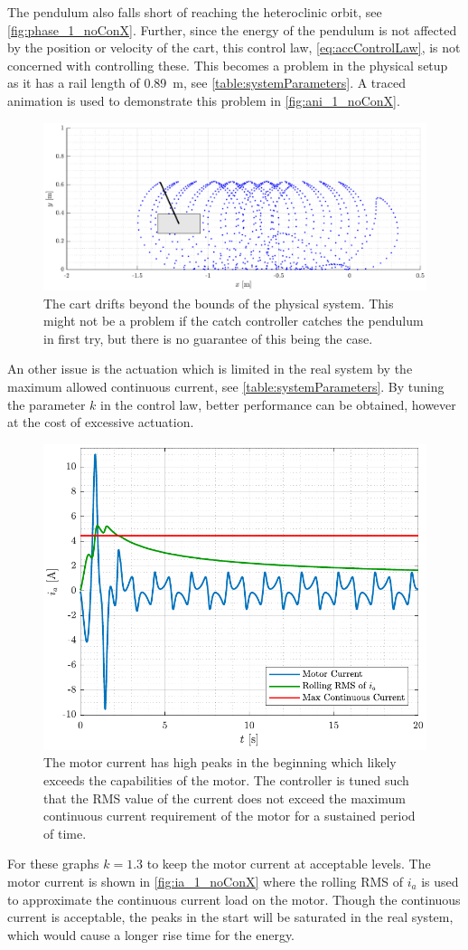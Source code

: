 %
The pendulum also falls short of reaching the heteroclinic orbit, see \autoref{fig:phase_1_noConX}.
Further, since the energy of the pendulum is not affected by the position or velocity of the cart, this control law, \autoref{eq:accControlLaw}, is not concerned with controlling these. This becomes a problem in the physical setup as it has a rail length of \SI{0.89}{m}, see \autoref{table:systemParameters}. A traced animation is used to demonstrate this problem in \autoref{fig:ani_1_noConX}.
\begin{figure}[H]
  \includegraphics[width=.7\textwidth]{figures/ani_1_noConX}
  \caption{The cart drifts beyond the bounds of the physical system. This might not be a problem if the catch controller catches the pendulum in first try, but there is no guarantee of this being the case.}
  \label{fig:ani_1_noConX}
\end{figure}
%
An other issue is the actuation which is limited in the real system by the maximum allowed continuous current, see \autoref{table:systemParameters}. By tuning the parameter $k$ in the control law, better performance can be obtained, however at the cost of excessive actuation.
%
\begin{figure}[H]
  \includegraphics[width=.52\textwidth]{figures/ia_1_noConX}
  \caption{The motor current has high peaks in the beginning which likely exceeds the capabilities of the motor. The controller is tuned such that the RMS value of the current does not exceed the maximum continuous current requirement of the motor for a sustained period of time.}
  \label{fig:ia_1_noConX}
\end{figure}
%
For these graphs $k=1.3$ to keep the motor current at acceptable levels. The motor current is shown in \autoref{fig:ia_1_noConX} where the rolling RMS of $i_a$ is used to approximate the continuous current load on the motor. Though the continuous current is acceptable, the peaks in the start will be saturated in the real system, which would cause a longer rise time for the energy.

